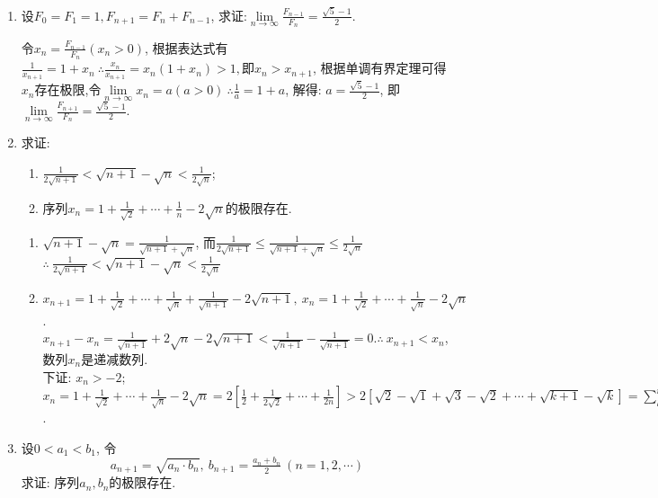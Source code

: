 \begin{enumerate}
\begin{solution}
		
	\end{solution}
	\item 设$F_0=F_1=1,F_{n+1}=F_n+F_{n-1}$, 求证:$\lim\limits_{n\rightarrow \infty}\tfrac{F_{n-1}}{F_n}=\frac{\sqrt{5}-1}{2}$.
	\begin{solution}
		令$x_n=\frac{F_{n-1}}{F_n}(x_n>0)$, 根据表达式有$\frac{1}{x_{n+1}}=1+x_n\ \therefore \frac{x_n}{x_{n+1}}=x_n(1+x_n)>1,\text{即}x_n>x_{n+1}$, 根据单调有界定理可得${x_n}$存在极限,令$\lim\limits_{n \rightarrow \infty}x_n=a(a>0)\ \therefore \frac{1}{a}=1+a$, 解得: $a=\frac{\sqrt{5}-1}{2}$, 即$\lim\limits_{n\rightarrow \infty}\frac{F_{n+1}}{F_n}=\frac{\sqrt{5}-1}{2}$.
	\end{solution}
	\item 求证:
	\begin{enumerate}
		\item $\frac{1}{2\sqrt{n+1}}<\sqrt{n+1}-\sqrt{n}<\frac{1}{2\sqrt{n}}$;
		\item 序列$x_n=1+\frac{1}{\sqrt{2}}+\cdots+\frac{1}{n}-2\sqrt{n}$的极限存在.
	\end{enumerate}
	\begin{solution}
		\begin{enumerate}
			
		 \item 	$\sqrt{n+1}-\sqrt{n}=\frac{1}{\sqrt{n+1}+\sqrt{n}}$, 而$ \frac{1}{2\sqrt{n+1}}\le \frac{1}{\sqrt{n+1}+\sqrt{n}}\le \frac{1}{2\sqrt{n}}$\ 
			$\therefore\ \frac{1}{2\sqrt{n+1}}<\sqrt{n+1}-\sqrt{n}<\frac{1}{2\sqrt{n}}$
		\item $x_{n+1}=1+\frac{1}{\sqrt{2}}+\cdots+\frac{1}{\sqrt{n}}+\frac{1}{\sqrt{n+1}}-2\sqrt{n+1},\ x_n=1+\frac{1}{\sqrt{2}}+\cdots+\frac{1}{\sqrt{n}}-2\sqrt{n}$.\\
		$x_{n+1}-x_n=\frac{1}{\sqrt{n+1}}+2\sqrt{n}-2\sqrt{n+1}<\frac{1}{\sqrt{n+1}}-\frac{1}{\sqrt{n+1}}=0$.$\therefore \ x_{n+1}<x_n$,数列${x_n}$是递减数列.\\
		下证: $x_n>-2$;\\
		$x_n=1+\frac{1}{\sqrt{2}}+\cdots+\frac{1}{\sqrt{n}}-2\sqrt{n}= 2[\frac{1}{2}+\frac{1}{2\sqrt{2}}+\cdots+\frac{1}{2n}]>2[\sqrt{2}-\sqrt{1}+\sqrt{3}-\sqrt{2}+\cdots+\sqrt{k+1}-\sqrt{k}]=\sum_{k=1}^n{2(\sqrt{k+1}-\sqrt{k})}-2\sqrt{n}=2(\sqrt{n+1}-1)-x\sqrt{n}>-2$.
		
		\end{enumerate}
		
		
	\end{solution}
	\item 设$0<a_1<b_1$, 令
	$$
		a_{n+1} = \sqrt{a_n\cdot b_n},\ b_{n+1}=\tfrac{a_n+b_n}{2}\ (n=1,2,\cdots)
	$$求证: 序列${a_n},{b_n}$的极限存在.
	\begin{solution}
		

\end{solution}
\end{enumerate}
